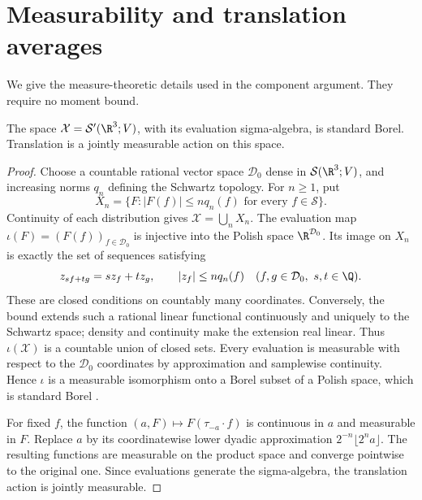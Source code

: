 \appendix
\section{Measurability and translation averages}\label{sec:background}
We give the measure-theoretic details used in the component argument.
They require no moment bound.

\begin{lemma}\label{lem:standard-borel}
The space \(\mathcal X=\mathcal S'(\R^3;V)\), with its evaluation
sigma-algebra, is standard Borel. Translation is a jointly measurable
action on this space.
\end{lemma}
\begin{proof}
Choose a countable rational vector space \(\mathcal D_0\) dense in
\(\mathcal S(\R^3;V)\), and increasing norms \(q_n\) defining the
Schwartz topology. For \(n\ge1\), put
\[
 X_n=\{F:|F(f)|\le n q_n(f)\text{ for every }f\in\mathcal S\}.
\]
Continuity of each distribution gives \(\mathcal X=\bigcup_nX_n\).
The evaluation map
\(\iota(F)=(F(f))_{f\in\mathcal D_0}\) is injective into the
Polish space \(\R^{\mathcal D_0}\).
Its image on \(X_n\) is exactly the set of sequences satisfying
\[
 z_{sf+tg}=sz_f+tz_g,\qquad |z_f|\le n q_n(f)
 \quad(f,g\in\mathcal D_0,\ s,t\in\Q).
\]
These are closed conditions on countably many coordinates.
Conversely, the bound extends such a rational linear functional
continuously and uniquely to the Schwartz space; density and
continuity make the extension real linear.
Thus \(\iota(\mathcal X)\) is a countable union of closed sets.
Every evaluation is measurable with respect to the
\(\mathcal D_0\) coordinates by approximation and samplewise
continuity. Hence \(\iota\) is a measurable isomorphism onto a
Borel subset of a Polish space, which is standard Borel
\cite[Theorem~2.1.22]{Durrett2019}.

For fixed \(f\), the function
\((a,F)\mapsto F(\tau_{-a}\cdot f)\) is continuous in \(a\) and
measurable in \(F\). Replace \(a\) by its coordinatewise lower
dyadic approximation \(2^{-n}\lfloor2^na\rfloor\).
The resulting functions are measurable on the product space and
converge pointwise to the original one. Since evaluations generate
the sigma-algebra, the translation action is jointly measurable.
\end{proof}

